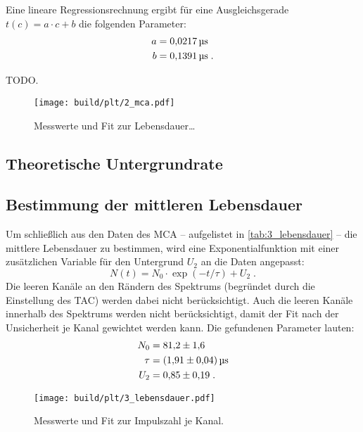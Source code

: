 Eine lineare Regressionsrechnung ergibt
für eine Ausgleichsgerade $t(c) = a \cdot c + b$
die folgenden Parameter:
\begin{align*}
    a &=\SI{0.0217 \pm 0}{\micro\second} \\
    b &=\SI{0.1391 \pm 0}{\micro\second} \; .
\end{align*}

\begin{table}
    \centering
    \caption{TODO.}
    \label{tab:2_mca}
\end{table}

\begin{figure}
    \centering
    \texttt{[image: build/plt/2\_mca.pdf]}
    \caption{Messwerte und Fit zur Lebensdauer…}
    \label{fig:plt:2_mca}
\end{figure}


\FloatBarrier
\subsection{Theoretische Untergrundrate}


\FloatBarrier
\subsection{Bestimmung der mittleren Lebensdauer}
Um schließlich aus den Daten des \ac{MCA}
– aufgelistet in \autoref{tab:3_lebensdauer} –
die mittlere Lebensdauer zu bestimmen,
wird eine Exponentialfunktion mit einer zusätzlichen Variable für den Untergrund $U_2$ an die Daten angepasst:
\begin{equation*}
    N(t) = N_0 \cdot \exp (-t / \tau) + U_2 \; .
\end{equation*}
Die leeren Kanäle an den Rändern des Spektrums (begründet durch die Einstellung des \ac{TAC}) werden dabei nicht berücksichtigt.
Auch die leeren Kanäle innerhalb des Spektrums werden nicht berücksichtigt,
damit der Fit nach der Unsicherheit je Kanal gewichtet werden kann.
Die gefundenen Parameter lauten:
\begin{align*}
    N_0 &= \num{81.2 \pm 1.6} \\
    \tau &= \SI{1.91 \pm 0.04}{\micro\second} \\
    U_2 &= \num{0.85 \pm 0.19} \; .
\end{align*}

\begin{figure}
    \centering
    \texttt{[image: build/plt/3\_lebensdauer.pdf]}
    \caption{Messwerte und Fit zur Impulszahl je Kanal.}
    \label{fig:plt:3_lebensdauer}
\end{figure}
